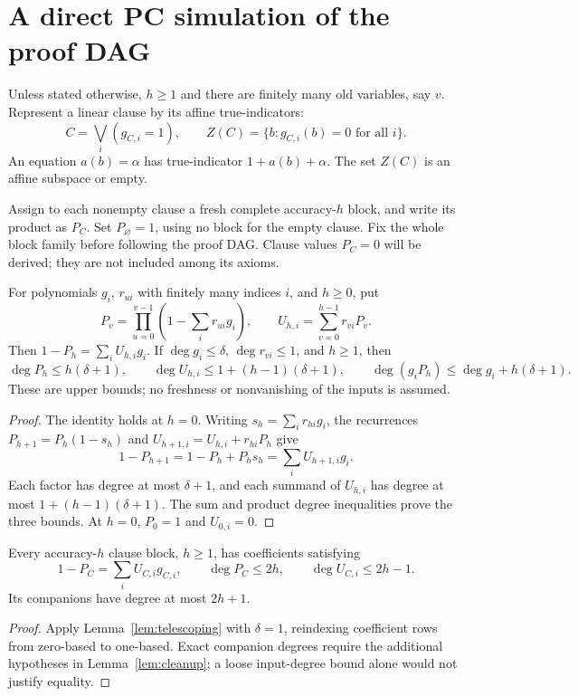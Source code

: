 \section{A direct PC simulation of the proof DAG}\label{sec:clause-simulation}

Unless stated otherwise, \(h\ge1\) and there are finitely many old
variables, say \(v\). Represent a linear clause by its affine true-indicators:
\[
 C=\bigvee_i(g_{C,i}=1),\qquad
 Z(C)=\{b:g_{C,i}(b)=0\text{ for all }i\}.
\]
An equation \(a(b)=\alpha\) has true-indicator \(1+a(b)+\alpha\).
The set \(Z(C)\) is an affine subspace or empty.

Assign to each nonempty clause a fresh complete accuracy-\(h\) block,
and write its product as \(P_C\). Set \(P_\varnothing=1\), using no
block for the empty clause.  Fix the whole block family before following
the proof DAG. Clause values \(P_C=0\) will be derived; they are not
included among its axioms.

\begin{lemma}\label{lem:telescoping}
For polynomials \(g_i\), \(r_{ui}\) with finitely many indices \(i\), and \(h\ge0\), put
\[
 P_v=\prod_{u=0}^{v-1}\left(1-\sum_i r_{ui}g_i\right),\qquad
 U_{h,i}=\sum_{v=0}^{h-1}r_{vi}P_v.
\]
Then \(1-P_h=\sum_i U_{h,i}g_i\).
If \(\deg g_i\le\delta\), \(\deg r_{vi}\le1\), and \(h\ge1\), then
\[
 \deg P_h\le h(\delta+1),\qquad
 \deg U_{h,i}\le1+(h-1)(\delta+1),\qquad
 \deg(g_iP_h)\le\deg g_i+h(\delta+1).
\]
These are upper bounds; no freshness or nonvanishing of the inputs is assumed.
\end{lemma}
\begin{proof}
The identity holds at \(h=0\). Writing \(s_h=\sum_i r_{hi}g_i\), the
recurrences \(P_{h+1}=P_h(1-s_h)\) and
\(U_{h+1,i}=U_{h,i}+r_{hi}P_h\) give
\[
 1-P_{h+1}=1-P_h+P_hs_h=\sum_i U_{h+1,i}g_i.
\]
Each factor has degree at most \(\delta+1\), and each summand of
\(U_{h,i}\) has degree at most \(1+(h-1)(\delta+1)\).
The sum and product degree inequalities prove the three bounds. At \(h=0\), \(P_0=1\) and \(U_{0,i}=0\).
\end{proof}

\begin{corollary}\label{lem:prefix}
Every accuracy-\(h\) clause block, \(h\ge1\), has coefficients satisfying
\begin{equation}\label{eq:prefix}
 1-P_C=\sum_iU_{C,i}g_{C,i},\qquad
 \deg P_C\le2h,\qquad\deg U_{C,i}\le2h-1.
\end{equation}
Its companions have degree at most \(2h+1\).
\end{corollary}
\begin{proof}
Apply Lemma~\ref{lem:telescoping} with \(\delta=1\), reindexing coefficient
rows from zero-based to one-based. Exact companion degrees require the
additional hypotheses in Lemma~\ref{lem:cleanup}; a loose input-degree
bound alone would not justify equality.
\end{proof}

